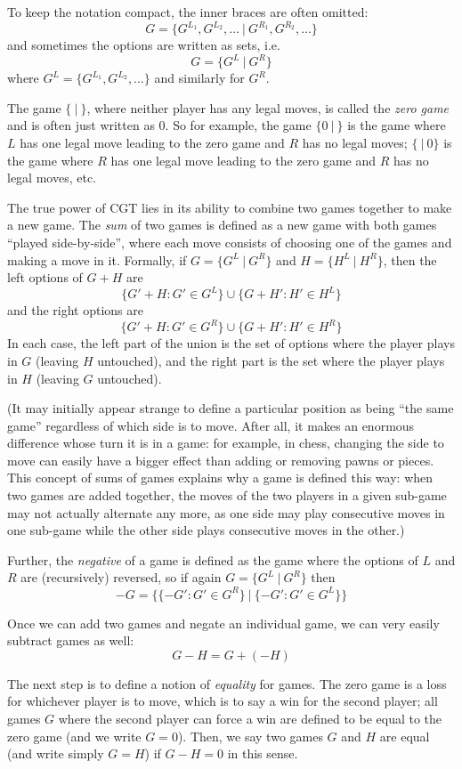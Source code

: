 \documentclass[a4paper,twocolumn]{article}
\begin{document}
To keep the notation compact, the inner braces are often omitted:
$$G = \{G^{L_1}, G^{L_2}, \ldots \:|\: G^{R_1}, G^{R_2}, \ldots\}$$
and sometimes the options are written as sets, i.e. $$G = \{G^L \:|\:
G^R\}$$ where $G^L = \{G^{L_1}, G^{L_2}, \ldots\}$ and similarly for
$G^R$.

The game $\{\:|\:\}$, where neither player has any legal moves, is
called the \emph{zero game} and is often just written as $0$. So for
example, the game $\{0\:|\:\}$ is the game where $L$ has one legal
move leading to the zero game and $R$ has no legal moves; $\{\:|\:0\}$
is the game where $R$ has one legal move leading to the zero game and
$R$ has no legal moves, etc.

The true power of CGT lies in its ability to combine two games
together to make a new game. The \emph{sum} of two games is defined as
a new game with both games ``played side-by-side'', where each move
consists of choosing one of the games and making a move in
it. Formally, if $G = \{G^L \:|\: G^R\}$ and $H = \{H^L \:|\: H^R\}$,
then the left options of $G+H$ are $$\{G'+H : G' \in G^L\} \cup \{G+H'
: H' \in H^L\}$$ and the right options are $$\{G'+H : G' \in G^R\}
\cup \{G+H' : H' \in H^R\}$$ In each case, the left part of the union
is the set of options where the player plays in $G$ (leaving $H$
untouched), and the right part is the set where the player plays in
$H$ (leaving $G$ untouched).

(It may initially appear strange to define a particular position as
being ``the same game'' regardless of which side is to move. After
all, it makes an enormous difference whose turn it is in a game: for
example, in chess, changing the side to move can easily have a bigger
effect than adding or removing pawns or pieces. This concept of sums
of games explains why a game is defined this way: when two games are
added together, the moves of the two players in a given sub-game may
not actually alternate any more, as one side may play consecutive
moves in one sub-game while the other side plays consecutive moves in
the other.)

Further, the \emph{negative} of a game is defined as the game where
the options of $L$ and $R$ are (recursively) reversed, so if again $G
= \{G^L \:|\: G^R\}$ then $$-G = \{\{-G' : G' \in G^R\} \:|\: \{-G' :
G' \in G^L\}\}$$

Once we can add two games and negate an individual game, we can very
easily subtract games as well: $$G - H = G + (-H)$$

The next step is to define a notion of \emph{equality} for games. The
zero game is a loss for whichever player is to move, which is to say a
win for the second player; all games $G$ where the second player can
force a win are defined to be equal to the zero game (and we write $G
= 0$). Then, we say two games $G$ and $H$ are equal (and write simply
$G = H$) if $G - H = 0$ in this sense.
\end{document}
